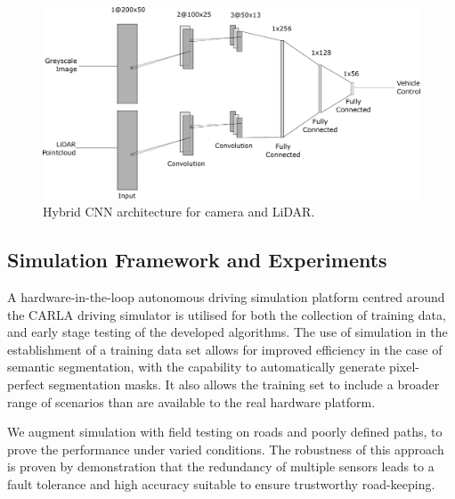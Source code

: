 \begin{figure}[ht] 
	\centering    
	\includegraphics[width=\textwidth]{network}
	\caption{Hybrid CNN architecture for camera and LiDAR.}
	\label{fig:a:network}
\end{figure}

\subsection{Simulation Framework and Experiments}
A hardware-in-the-loop autonomous driving simulation platform centred around the CARLA driving simulator is utilised for both the collection of training data, and early stage testing of the developed algorithms. The use of simulation in the establishment of a training data set allows for improved efficiency in the case of semantic segmentation, with the capability to automatically generate pixel-perfect segmentation masks. It also allows the training set to include a broader range of scenarios than are available to the real hardware platform. 

We augment simulation with field testing on roads and poorly defined paths, to prove the performance under varied conditions. The robustness of this approach is proven by demonstration that the redundancy of multiple sensors leads to a fault tolerance and high accuracy suitable to ensure trustworthy road-keeping.


